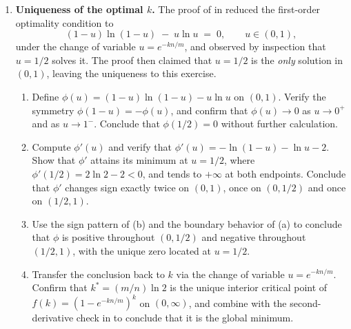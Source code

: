 \begin{enumerate}
\item \exstarstar
\label{ex:ch5-5}
\textbf{Uniqueness of the optimal $k$.}
The proof of  in 
reduced the first-order optimality condition to
\[
  (1 - u)\ln(1 - u) \;-\; u \ln u \;=\; 0, \qquad u \in (0, 1),
\]
under the change of variable $u = e^{-kn/m}$, and observed by
inspection that $u = 1/2$ solves it. The proof then claimed that
$u = 1/2$ is the \emph{only} solution in $(0, 1)$, leaving the
uniqueness to this exercise.
\begin{enumerate}
  \item[(a)] Define $\phi(u) = (1 - u)\ln(1 - u) - u \ln u$ on
    $(0, 1)$. Verify the symmetry $\phi(1 - u) = -\phi(u)$, and
    confirm that $\phi(u) \to 0$ as $u \to 0^+$ and as $u \to 1^-$.
    Conclude that $\phi(1/2) = 0$ without further calculation.
  \item[(b)] Compute $\phi'(u)$ and verify that $\phi'(u) =
    -\ln(1 - u) - \ln u - 2$. Show that $\phi'$ attains its minimum
    at $u = 1/2$, where $\phi'(1/2) = 2 \ln 2 - 2 < 0$, and tends to
    $+\infty$ at both endpoints. Conclude that $\phi'$ changes sign
    exactly twice on $(0, 1)$, once on $(0, 1/2)$ and once on
    $(1/2, 1)$.
  \item[(c)] Use the sign pattern of (b) and the boundary behavior of
    (a) to conclude that $\phi$ is positive throughout $(0, 1/2)$
    and negative throughout $(1/2, 1)$, with the unique zero located
    at $u = 1/2$.
  \item[(d)] Transfer the conclusion back to $k$ via the change of
    variable $u = e^{-kn/m}$. Confirm that $k^* = (m/n) \ln 2$ is
    the unique interior critical point of $f(k) = (1 - e^{-kn/m})^k$
    on $(0, \infty)$, and combine with the second-derivative check
    in  to conclude that it is the
    global minimum.
\end{enumerate}


\end{enumerate}
